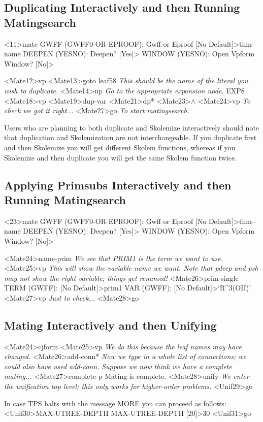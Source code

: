 \subsection{Duplicating Interactively and then Running Matingsearch}

\begin{tpsexample}
<11>mate
GWFF (GWFF0-OR-EPROOF): Gwff or Eproof [No Default]>thm-name
DEEPEN (YESNO): Deepen? [Yes]>
WINDOW (YESNO): Open Vpform Window? [No]>

<Mate12>vp
<Mate13>goto leaf58
{\it This should be the name of the literal you wish to duplicate.}
<Mate14>up
{\it Go to the appropriate expansion node.}
EXP8
<Mate18>vp
<Mate19>dup-var
<Mate21>dp*
<Mate23>\(\wedge\)
<Mate24>vp
{\it To check we got it right...}
<Mate27>go
{\it To start matingsearch.}
\end{tpsexample}

Users who are planning to both duplicate and Skolemize interactively should
note that duplication and Skolemization are not interchangeable. If
you duplicate first and then Skolemize you will get different Skolem
functions, whereas if you Skolemize and then duplicate you will get
the same Skolem function twice.

\subsection{Applying Primsubs Interactively and then Running Matingsearch}

\begin{tpsexample}
<23>mate
GWFF (GWFF0-OR-EPROOF): Gwff or Eproof [No Default]>thm-name
DEEPEN (YESNO): Deepen? [Yes]>
WINDOW (YESNO): Open Vpform Window? [No]>

<Mate24>name-prim
{\it We see that PRIM1 is the term we want to use.}
<Mate25>vp
{\it This will show the variable name we want. Note that pdeep and psh may
not show the right variable; things get renamed!}
<Mate26>prim-single
TERM (GWFF):  [No Default]>prim1
VAR (GWFF):  [No Default]>`R^3(OII)'
<Mate27>vp	
{\it Just to check...}
<Mate28>go
\end{tpsexample}

\subsection{Mating Interactively and then Unifying}

\begin{tpsexample}
<Mate24>cjform
<Mate25>vp
{\it We do this because the leaf names may have changed.}
<Mate26>add-conn*
{\it Now we type in a whole list of connections; we could also have used add-conn.}
{\it Suppose we now think we have a complete mating...}
<Mate27>complete-p
Mating is complete.
<Mate28>unify
{\it We enter the unification top level; this only works for higher-order problems.}
<Unif29>go

In case TPS halts with the message
MORE
you can proceed as follows:
<Unif30>MAX-UTREE-DEPTH
MAX-UTREE-DEPTH [20]>30
<Unif31>go
\end{tpsexample}

